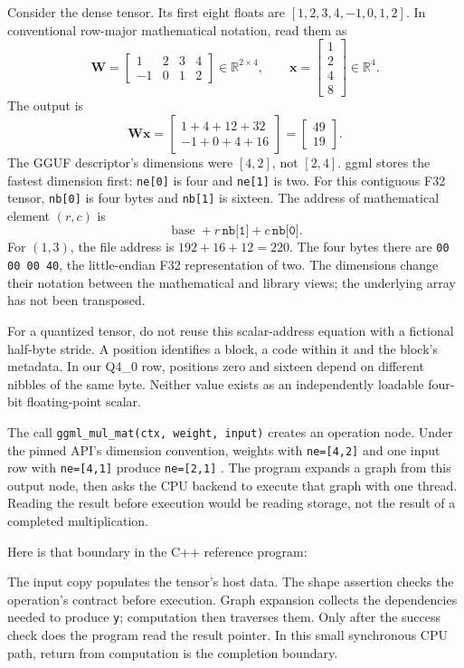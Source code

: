 Consider the dense tensor. Its first eight floats are
$[1,2,3,4,-1,0,1,2]$. In conventional row-major mathematical
notation, read them as
\[
\mathbf W=
\begin{bmatrix}1&2&3&4\\-1&0&1&2\end{bmatrix}
\in\mathbb R^{2\times4},\qquad
\mathbf x=\begin{bmatrix}1\\2\\4\\8\end{bmatrix}
\in\mathbb R^4.
\]
The output is
\[
\mathbf W\mathbf x=
\begin{bmatrix}1+4+12+32\\-1+0+4+16\end{bmatrix}
=\begin{bmatrix}49\\19\end{bmatrix}.
\]
The GGUF descriptor's dimensions were $[4,2]$, not $[2,4]$.
ggml stores the fastest dimension first: \texttt{ne[0]} is four
and \texttt{ne[1]} is two. For this contiguous F32 tensor,
\texttt{nb[0]} is four bytes and \texttt{nb[1]} is sixteen.
The address of mathematical element $(r,c)$ is
\[
\operatorname{base}+r\,\texttt{nb[1]}+c\,\texttt{nb[0]}.
\]
For $(1,3)$, the file address is $192+16+12=220$.
The four bytes there are \texttt{00 00 00 40}, the little-endian
F32 representation of two. The dimensions change their notation
between the mathematical and library views; the underlying array
has not been transposed.

For a quantized tensor, do not reuse this scalar-address equation
with a fictional half-byte stride. A position identifies a block,
a code within it and the block's metadata. In our Q4\_0 row,
positions zero and sixteen depend on different nibbles of the
same byte. Neither value exists as an independently loadable
four-bit floating-point scalar.

The call \texttt{ggml\_mul\_mat(ctx, weight, input)} creates an
operation node. Under the pinned API's dimension convention,
weights with \texttt{ne=[4,2]} and one input row with
\texttt{ne=[4,1]} produce \texttt{ne=[2,1]}
\cite{ggml2026apipinned}. The program expands a graph from this
output node, then asks the CPU backend to execute that graph
with one thread. Reading the result before execution would be
reading storage, not the result of a completed multiplication.

Here is that boundary in the C++ reference program:
\par\medskip\noindent\begin{minipage}{\linewidth}
\end{minipage}\par\medskip
The input copy populates the tensor's host data. The shape assertion
checks the operation's contract before execution. Graph expansion
collects the dependencies needed to produce \texttt{y}; computation
then traverses them. Only after the success check does the program
read the result pointer. In this small synchronous CPU path, return
from computation is the completion boundary.

